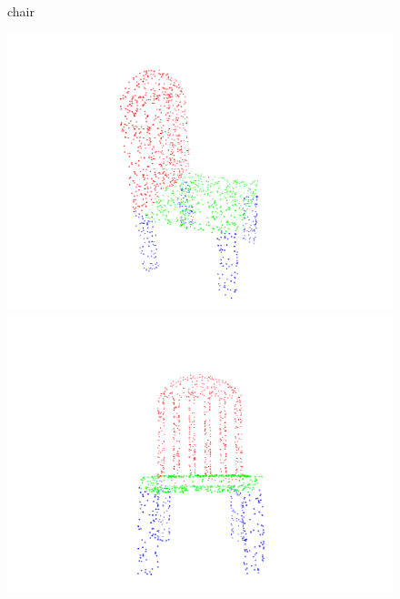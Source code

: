 \begin{figure}[htbp]
    \begin{minipage}{0.1\textwidth}
        \centering
        {chair}
    \end{minipage}
    \hfill
    \begin{minipage}{0.25\textwidth}
        \centering
        \includegraphics[width=\textwidth]{fig/supplement/part_segmentation/chair/chair00.pdf}
    \end{minipage}
    \hfill
    \begin{minipage}{0.25\textwidth}
        \centering
        \includegraphics[width=\textwidth]{fig/supplement/part_segmentation/chair/chair01.pdf}
    \end{minipage}
    \hfill
    \begin{minipage}{0.25\textwidth}

\end{minipage}
\end{figure}
